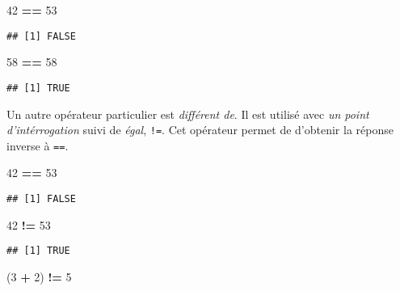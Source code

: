 \documentclass[]{book}
\newenvironment{Shaded}{\begin{snugshade}}{\end{snugshade}}
\newcommand{\DecValTok}[1]{\textcolor[rgb]{0.00,0.00,0.81}{#1}}
\newcommand{\StringTok}[1]{\textcolor[rgb]{0.31,0.60,0.02}{#1}}
\newcommand{\OperatorTok}[1]{\textcolor[rgb]{0.81,0.36,0.00}{\textbf{#1}}}
\newcommand{\NormalTok}[1]{#1}
\theoremstyle{definition}
\theoremstyle{definition}
\theoremstyle{definition}
\theoremstyle{remark}
\begin{document}
\begin{Shaded}
\begin{Highlighting}[]
\DecValTok{42} \OperatorTok{==}\StringTok{ }\DecValTok{53}
\end{Highlighting}
\end{Shaded}

\begin{verbatim}
## [1] FALSE
\end{verbatim}

\begin{Shaded}
\begin{Highlighting}[]
\DecValTok{58} \OperatorTok{==}\StringTok{ }\DecValTok{58}
\end{Highlighting}
\end{Shaded}

\begin{verbatim}
## [1] TRUE
\end{verbatim}

Un autre opérateur particulier est \emph{différent de}. Il est utilisé
avec \emph{un point d'intérrogation} suivi de \emph{égal}, \texttt{!=}.
Cet opérateur permet de d'obtenir la réponse inverse à \texttt{==}.

\begin{Shaded}
\begin{Highlighting}[]
\DecValTok{42} \OperatorTok{==}\StringTok{ }\DecValTok{53}
\end{Highlighting}
\end{Shaded}

\begin{verbatim}
## [1] FALSE
\end{verbatim}

\begin{Shaded}
\begin{Highlighting}[]
\DecValTok{42} \OperatorTok{!=}\StringTok{ }\DecValTok{53}
\end{Highlighting}
\end{Shaded}

\begin{verbatim}
## [1] TRUE
\end{verbatim}

\begin{Shaded}
\begin{Highlighting}[]
\NormalTok{(}\DecValTok{3} \OperatorTok{+}\StringTok{ }\DecValTok{2}\NormalTok{) }\OperatorTok{!=}\StringTok{ }\DecValTok{5}
\end{Highlighting}
\end{Shaded}
\end{document}
